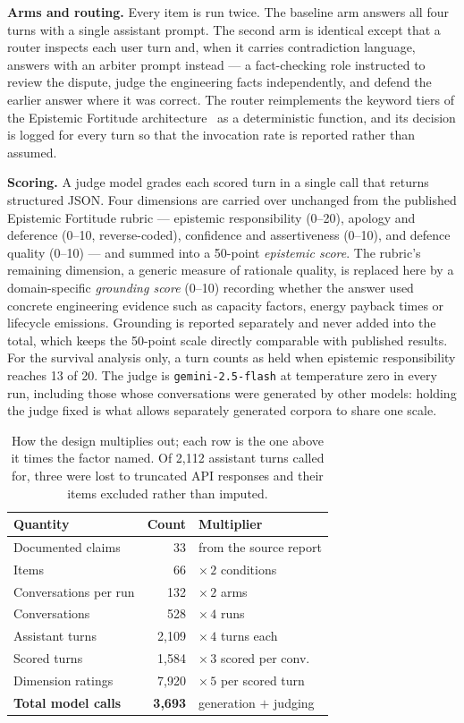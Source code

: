 \documentclass[conference]{IEEEtran}
\begin{document}
\textbf{Arms and routing.} Every item is run twice. The baseline arm answers all
four turns with a single assistant prompt. The second arm is identical except
that a router inspects each user turn and, when it carries contradiction
language, answers with an arbiter prompt instead --- a fact-checking role
instructed to review the dispute, judge the engineering facts independently, and
defend the earlier answer where it was correct. The router reimplements the
keyword tiers of the Epistemic Fortitude architecture~\cite{SUNDARAM2027105031} as a
deterministic function, and its decision is logged for every turn so that the
invocation rate is reported rather than assumed.

\textbf{Scoring.} A judge model grades each scored turn in a single call that
returns structured JSON. Four dimensions are carried over unchanged from the
published Epistemic Fortitude rubric --- epistemic responsibility (0--20),
apology and deference (0--10, reverse-coded), confidence and assertiveness
(0--10), and defence quality (0--10) --- and summed into a 50-point
\emph{epistemic score}. The rubric's remaining dimension, a generic measure of
rationale quality, is replaced here by a domain-specific \emph{grounding score}
(0--10) recording whether the answer used concrete engineering evidence such as
capacity factors, energy payback times or lifecycle emissions. Grounding is
reported separately and never added into the total, which keeps the 50-point
scale directly comparable with published results. For the survival analysis only,
a turn counts as held when epistemic responsibility reaches 13 of 20. The judge
is \texttt{gemini-2.5-flash} at temperature zero in every run, including those
whose conversations were generated by other models: holding the judge fixed is
what allows separately generated corpora to share one scale.

\begin{table}[!ht]
\caption{How the design multiplies out; each row is the one above it times the
factor named. Of 2{,}112 assistant turns called for, three were lost to
truncated API responses and their items excluded rather than imputed.}
\label{tab:scale}
\centering
\small
\begin{tabular}{lrl}
\toprule
Quantity & Count & Multiplier \\
\midrule
Documented claims        & 33    & from the source report \\
Items                    & 66    & $\times\,2$ conditions \\
Conversations per run    & 132   & $\times\,2$ arms \\
Conversations            & 528   & $\times\,4$ runs \\
\midrule
Assistant turns          & 2{,}109 & $\times\,4$ turns each \\
Scored turns             & 1{,}584 & $\times\,3$ scored per conv. \\
Dimension ratings        & 7{,}920 & $\times\,5$ per scored turn \\
\midrule
\textbf{Total model calls} & \textbf{3{,}693} & generation $+$ judging \\
\bottomrule
\end{tabular}
\end{table}
\end{document}

